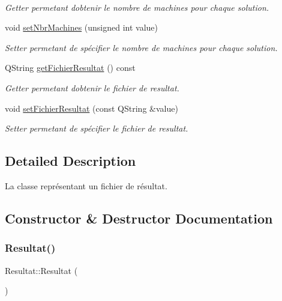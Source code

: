 \begin{DoxyCompactItemize}
$$\begin{DoxyCompactList}\small\item\em Getter permetant d\textquotesingle{}obtenir le nombre de machines pour chaque solution. \end{DoxyCompactList}\item 
void \hyperlink{classResultat_a5de638751a3dadde3d8765663a3d1403}{set\+Nbr\+Machines} (unsigned int value)
\begin{DoxyCompactList}\small\item\em Setter permetant de spécifier le nombre de machines pour chaque solution. \end{DoxyCompactList}\item 
Q\+String \hyperlink{classResultat_a77306ef96fc23df3eeea71c986755509}{get\+Fichier\+Resultat} () const
\begin{DoxyCompactList}\small\item\em Getter permetant d\textquotesingle{}obtenir le fichier de resultat. \end{DoxyCompactList}\item 
void \hyperlink{classResultat_a075763b45ce7ff0e43d1d9e5e425b78c}{set\+Fichier\+Resultat} (const Q\+String \&value)
\begin{DoxyCompactList}\small\item\em Setter permetant de spécifier le fichier de resultat. \end{DoxyCompactList}\end{DoxyCompactItemize}


\subsection{Detailed Description}
La classe représentant un fichier de résultat. 

\subsection{Constructor \& Destructor Documentation}
\mbox{\label{classResultat_acc2413409ddb57b3d1ac405d8bdfb922}} 
\subsubsection{\texorpdfstring{Resultat()}{Resultat()}}
{\footnotesize\ttfamily Resultat\+::\+Resultat (\begin{DoxyParamCaption}{ }\end{DoxyParamCaption})}



